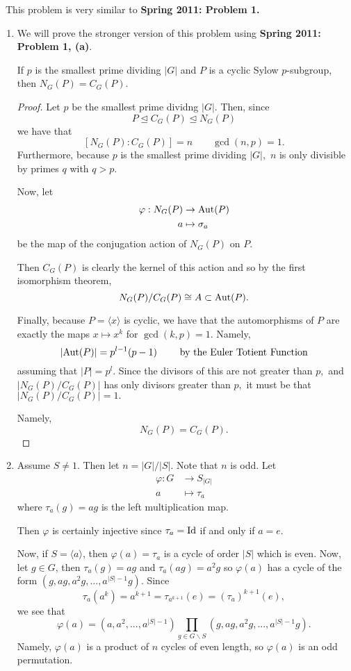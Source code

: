 \documentclass[12pt]{AlgebraQual}
\begin{document}
\begin{solution}$\,$
This problem is very similar to \textbf{Spring 2011: Problem 1.}
\begin{enumerate}[label=(\alph*)]
    \item We will prove the stronger version of this problem using \textbf{Spring 2011: Problem 1, (a)}.

    \begin{claim} If $p$ is the smallest prime dividing $|G|$ and $P$ is a cyclic Sylow $p$-subgroup, then $N_G(P)=C_G(P).$
    \begin{proof} Let $p$ be the smallest prime dividng $|G|.$ Then, since $$P\trianglelefteq C_G(P)\trianglelefteq N_G(P)$$ we have that $$[N_G(P):C_G(P)]=n\qquad \gcd(n,p)=1.$$ Furthermore, because $p$ is the smallest prime dividing $|G|,$ $n$ is only divisible by primes $q$ with $q>p.$

    Now, let \begin{align*}
        \varphi:N_G(P)&\to\text{Aut}(P)\\
        a&\mapsto\sigma_a
    \end{align*} be the map of the conjugation action of $N_G(P)$ on $P.$

    Then $C_G(P)$ is clearly the kernel of this action and so by the first isomorphism theorem, $$N_G(P)/C_G(P)\cong A\subset\text{Aut}(P).$$

    Finally, because $P=\langle x\rangle$ is cyclic, we have that the automorphisms of $P$ are exactly the maps $x\mapsto x^k$ for $\gcd(k,p)=1$. Namely, $$|\text{Aut}(P)|=p^{l-1}(p-1)\qquad\text{ by the Euler Totient Function}$$ assuming that $|P|=p^l$. Since the divisors of this are not greater than $p,$ and $|N_G(P)/C_G(P)|$ has only divisors greater than $p,$ it must be that $|N_G(P)/C_G(P)|=1.$

    Namely, $$N_G(P)=C_G(P).$$
    \end{proof}
    \end{claim}

    \item Assume $S\not=1$. Then let $n=|G|/|S|$. Note that $n$ is odd. Let \begin{align*}
        \varphi:G&\to S_{|G|}\\
        a&\mapsto \tau_a
    \end{align*} where $\tau_a(g)=ag$ is the left multiplication map.

    Then $\varphi$ is certainly injective since $\tau_a=\text{Id}$ if and only if $a=e$.

    Now, if $S=\langle a\rangle$, then $\varphi(a)=\tau_a$ is a cycle of order $|S|$ which is even. Now, let $g\in G$, then $\tau_a(g)=ag$ and $\tau_a(ag)=a^2g$ so $\varphi(a)$ has a cycle of the form $(g,ag,a^2g,...,a^{|S|-1}g)$. Since $$\tau_a(a^k)=a^{k+1}=\tau_{a^{k+1}}(e)=(\tau_a)^{k+1}(e),$$ we see that $$\varphi(a)=(a,a^2,...,a^{|S|-1})\prod_{g\in G\backslash S}(g,ag,a^2g,...,a^{|S|-1}g).$$ Namely, $\varphi(a)$ is a product of $n$ cycles of even length, so $\varphi(a)$ is an odd permutation.


\end{enumerate}
\end{solution}
\end{document}
